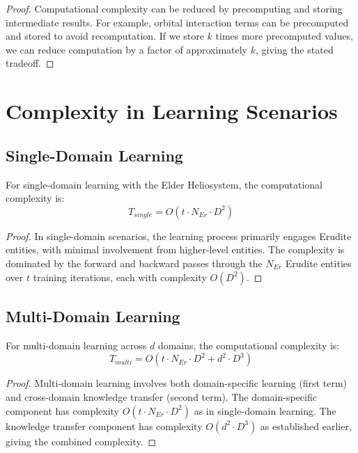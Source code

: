 \begin{proof}
Computational complexity can be reduced by precomputing and storing intermediate results. For example, orbital interaction terms can be precomputed and stored to avoid recomputation. If we store $k$ times more precomputed values, we can reduce computation by a factor of approximately $k$, giving the stated tradeoff.
\end{proof}

\section{Complexity in Learning Scenarios}

\subsection{Single-Domain Learning}

\begin{theorem}
For single-domain learning with the Elder Heliosystem, the computational complexity is:
\begin{equation}
T_{single} = O(t \cdot N_{Er} \cdot D^2)
\end{equation}
\end{theorem}

\begin{proof}
In single-domain scenarios, the learning process primarily engages Erudite entities, with minimal involvement from higher-level entities. The complexity is dominated by the forward and backward passes through the $N_{Er}$ Erudite entities over $t$ training iterations, each with complexity $O(D^2)$.
\end{proof}

\subsection{Multi-Domain Learning}

\begin{theorem}
For multi-domain learning across $d$ domains, the computational complexity is:
\begin{equation}
T_{multi} = O(t \cdot N_{Er} \cdot D^2 + d^2 \cdot D^3)
\end{equation}
\end{theorem}

\begin{proof}
Multi-domain learning involves both domain-specific learning (first term) and cross-domain knowledge transfer (second term). The domain-specific component has complexity $O(t \cdot N_{Er} \cdot D^2)$ as in single-domain learning. The knowledge transfer component has complexity $O(d^2 \cdot D^3)$ as established earlier, giving the combined complexity.
\end{proof}


